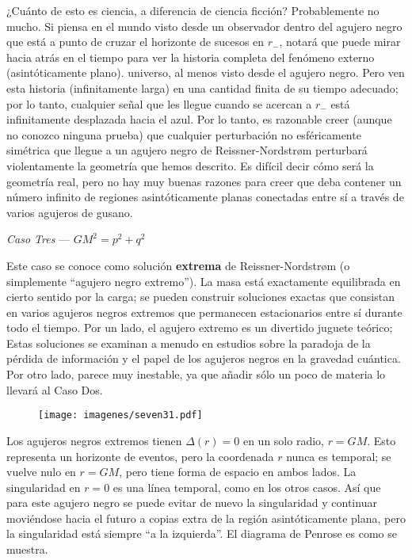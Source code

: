 \documentclass[11pt,b5paper,openany,twoside]{book}
\begin{document}
¿Cuánto de esto es ciencia, a diferencia de ciencia ficción?
Probablemente no mucho.
Si piensa en el mundo visto desde un observador dentro del agujero negro que está a punto de cruzar el horizonte de sucesos en $r_-$, notará que puede mirar hacia atrás en el tiempo para ver la historia completa del fenómeno externo (asintóticamente plano). universo, al menos visto desde el agujero negro.
Pero ven esta historia (infinitamente larga) en una cantidad finita de su tiempo adecuado; por lo tanto, cualquier señal que les llegue cuando se acercan a $r_-$ está infinitamente desplazada hacia el azul.
Por lo tanto, es razonable creer (aunque no conozco ninguna prueba) que cualquier perturbación no esféricamente simétrica que llegue a un agujero negro de Reissner-Nordstr{\o}m perturbará violentamente la geometría que hemos descrito.
Es difícil decir cómo será la geometría real, pero no hay muy buenas razones para creer que deba contener un número infinito de regiones asintóticamente planas conectadas entre sí a través de varios agujeros de gusano.

\noindent
{\it Caso Tres} --- $GM^2=p^2+q^2$

Este caso se conoce como solución {\bf extrema} de Reissner-Nordstr{\o}m (o simplemente ``agujero negro extremo'').
La masa está exactamente equilibrada en cierto sentido por la carga; se pueden construir soluciones exactas que consistan en varios agujeros negros extremos que permanecen estacionarios entre sí durante todo el tiempo.
Por un lado, el agujero extremo es un divertido juguete teórico; Estas soluciones se examinan a menudo en estudios sobre la paradoja de la pérdida de información y el papel de los agujeros negros en la gravedad cuántica.
Por otro lado, parece muy inestable, ya que añadir sólo un poco de materia lo llevará al Caso Dos.

\begin{figure}[ht]
\centering
\texttt{[image: imagenes/seven31.pdf]}
\end{figure}

Los agujeros negros extremos tienen $\Delta(r)=0$ en un solo radio, $r=GM$.
Esto representa un horizonte de eventos, pero la coordenada $r$ nunca es temporal; se vuelve nulo en $r=GM$, pero tiene forma de espacio en ambos lados.
La singularidad en $r=0$ es una línea temporal, como en los otros casos.
Así que para este agujero negro se puede evitar de nuevo la singularidad y continuar moviéndose hacia el futuro a copias extra de la región asintóticamente plana, pero la singularidad está siempre ``a la izquierda''. El diagrama de Penrose es como se muestra.
\end{document}
